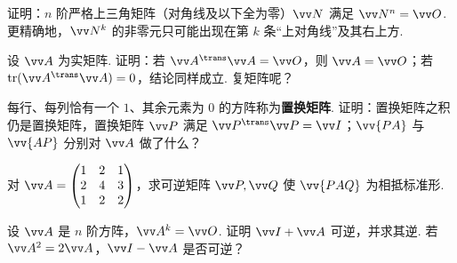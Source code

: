 {\begin{exB}
			\item\label{ex:mat:B12} 证明：$n$ 阶严格上三角矩阵（对角线及以下全为零）$\vv N$ 满足 $\vv N^n=\vv O$. 更精确地，$\vv N^k$ 的非零元只可能出现在第 $k$ 条“上对角线”及其右上方.
			\item\label{ex:mat:B13} 设 $\vv A$ 为实矩阵. 证明：若 $\vv A^\trans\vv A=\vv O$，则 $\vv A=\vv O$；若 $\tr(\vv A^\trans\vv A)=0$，结论同样成立. 复矩阵呢？
			\item\label{ex:mat:B14} 每行、每列恰有一个 $1$、其余元素为 $0$ 的方阵称为\textbf{置换矩阵}. 证明：置换矩阵之积仍是置换矩阵，置换矩阵 $\vv P$ 满足 $\vv P^\trans\vv P=\vv I$；$\vv{PA}$ 与 $\vv{AP}$ 分别对 $\vv A$ 做了什么？
			\item\label{ex:mat:B15} 对 $\vv A=\begin{pmatrix}1&2&1\\2&4&3\\1&2&2\end{pmatrix}$，求可逆矩阵 $\vv P,\vv Q$ 使 $\vv{PAQ}$ 为相抵标准形.
			\item\label{ex:mat:B16} 设 $\vv A$ 是 $n$ 阶方阵，$\vv A^k=\vv O$. 证明 $\vv I+\vv A$ 可逆，并求其逆. 若 $\vv A^2=2\vv A$，$\vv I-\vv A$ 是否可逆？
		\end{exB}
		
}
